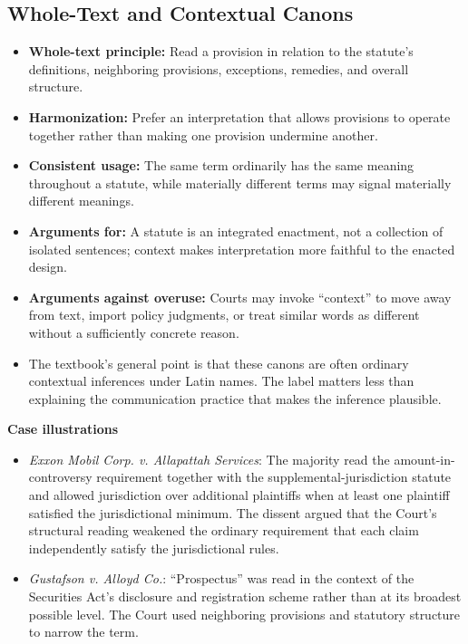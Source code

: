 \documentclass[11pt]{tex/lawoutline}
\begin{document}
\subsection{Whole-Text and Contextual Canons}

\begin{itemize}
    \item \textbf{Whole-text principle:} Read a provision in relation to the statute's definitions, neighboring provisions, exceptions, remedies, and overall structure.
    \item \textbf{Harmonization:} Prefer an interpretation that allows provisions to operate together rather than making one provision undermine another.
    \item \textbf{Consistent usage:} The same term ordinarily has the same meaning throughout a statute, while materially different terms may signal materially different meanings.
    \item \textbf{Arguments for:} A statute is an integrated enactment, not a collection of isolated sentences; context makes interpretation more faithful to the enacted design.
    \item \textbf{Arguments against overuse:} Courts may invoke ``context'' to move away from text, import policy judgments, or treat similar words as different without a sufficiently concrete reason.
    \item The textbook's general point is that these canons are often ordinary contextual inferences under Latin names. The label matters less than explaining the communication practice that makes the inference plausible.
\end{itemize}

\textbf{Case illustrations}

\begin{itemize}
    \item \textit{Exxon Mobil Corp. v. Allapattah Services}: The majority read the amount-in-controversy requirement together with the supplemental-jurisdiction statute and allowed jurisdiction over additional plaintiffs when at least one plaintiff satisfied the jurisdictional minimum. The dissent argued that the Court's structural reading weakened the ordinary requirement that each claim independently satisfy the jurisdictional rules.
    \item \textit{Gustafson v. Alloyd Co.}: ``Prospectus'' was read in the context of the Securities Act's disclosure and registration scheme rather than at its broadest possible level. The Court used neighboring provisions and statutory structure to narrow the term.
\end{itemize}
\end{document}
